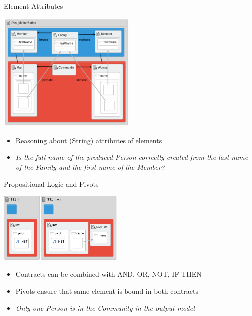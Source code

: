 \documentclass[xcolor=dvipsnames, 12pt, handout]{beamer}
\begin{document}
\begin{frame}{Element Attributes}
\begin{center}
\includegraphics[width=0.50\textwidth]{figures/Pos_MotherFather}
\end{center}
\pause
\begin{itemize}[<+->]
\item Reasoning about (String) attributes of elements
\item \textit{Is the full name of the produced Person correctly created from the last name of the Family and the first name of the Member?}
\end{itemize}
\end{frame}

\begin{frame}{Propositional Logic and Pivots}
\begin{center}
\begin{center}
\includegraphics[width=0.45\textwidth]{figures/syntactic_invariant}
\end{center}
\end{center}
\pause
\begin{itemize}[<+->]
\item Contracts can be combined with AND, OR, NOT, IF-THEN
\item Pivots ensure that same element is bound in both contracts
\item \textit{Only one Person is in the Community in the output model}
\end{itemize}
\end{frame}
\end{document}

